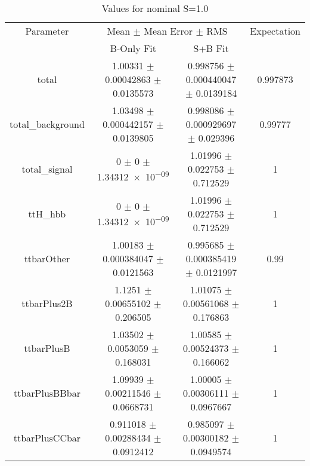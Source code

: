 \begin{table}
\centering
\caption{Values for nominal S=1.0}
\begin{tabular}{cccc}
\toprule
Parameter & \multicolumn{2}{c}{Mean $\pm$ Mean Error $\pm$ RMS} & Expectation\\
 & B-Only Fit & S+B Fit & \\
\midrule
total & \num{1.00331} $\pm$ \num{0.00042863} $\pm$ \num{0.0135573} & \num{0.998756} $\pm$ \num{0.000440047} $\pm$ \num{0.0139184} & \num{0.997873}\\
total\_background & \num{1.03498} $\pm$ \num{0.000442157} $\pm$ \num{0.0139805} & \num{0.998086} $\pm$ \num{0.000929697} $\pm$ \num{0.029396} & \num{0.99777}\\
total\_signal & \num{0} $\pm$ \num{0} $\pm$ \num{1.34312e-09} & \num{1.01996} $\pm$ \num{0.022753} $\pm$ \num{0.712529} & \num{1}\\
ttH\_hbb & \num{0} $\pm$ \num{0} $\pm$ \num{1.34312e-09} & \num{1.01996} $\pm$ \num{0.022753} $\pm$ \num{0.712529} & \num{1}\\
ttbarOther & \num{1.00183} $\pm$ \num{0.000384047} $\pm$ \num{0.0121563} & \num{0.995685} $\pm$ \num{0.000385419} $\pm$ \num{0.0121997} & \num{0.99}\\
ttbarPlus2B & \num{1.1251} $\pm$ \num{0.00655102} $\pm$ \num{0.206505} & \num{1.01075} $\pm$ \num{0.00561068} $\pm$ \num{0.176863} & \num{1}\\
ttbarPlusB & \num{1.03502} $\pm$ \num{0.0053059} $\pm$ \num{0.168031} & \num{1.00585} $\pm$ \num{0.00524373} $\pm$ \num{0.166062} & \num{1}\\
ttbarPlusBBbar & \num{1.09939} $\pm$ \num{0.00211546} $\pm$ \num{0.0668731} & \num{1.00005} $\pm$ \num{0.00306111} $\pm$ \num{0.0967667} & \num{1}\\
ttbarPlusCCbar & \num{0.911018} $\pm$ \num{0.00288434} $\pm$ \num{0.0912412} & \num{0.985097} $\pm$ \num{0.00300182} $\pm$ \num{0.0949574} & \num{1}\\
\bottomrule
\end{tabular}
\end{table}